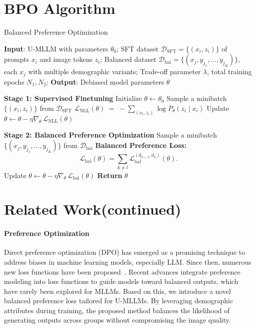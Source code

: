 \section{BPO Algorithm}
\begin{algorithm}[ht]
\caption{Balanced Preference Optimization}
\label{alg:balanced_finetuning}
\textbf{Input}: U-MLLM with parameters $\theta_0$; SFT dataset $\mathcal{D}_{\text{SFT}} = \{(x_i, z_i)\}$ of prompts $x_i$ and image tokens $z_i$; Balanced dataset $\mathcal{D}_{\text{bal}} = \{(x_j, y_{j_1}, \ldots, y_{j_K})\}$, each $x_j$ with multiple demographic variants; Trade-off parameter $\lambda$, total training epochs $N_1, N_2$;
\textbf{Output}: Debiased model parameters $\theta$

\begin{algorithmic}[1]
\STATE \textbf{Stage 1: Supervised Finetuning}
\STATE \quad Initialize $\theta \leftarrow \theta_0$
    \STATE Sample a minibatch $\{(x_i, z_i)\}$ from $\mathcal{D}_{\text{SFT}}$
    \STATE $\mathcal{L}_{\mathrm{NLL}}(\theta)\;=\; -\sum_{(x_i,z_i)}\log P_\theta(z_i \mid x_i)$
    \STATE Update $\theta \leftarrow \theta - \eta \nabla_{\theta}\,\mathcal{L}_{\mathrm{NLL}}(\theta)$
\ENDFOR

\STATE \textbf{Stage 2: Balanced Preference Optimization}
    \STATE Sample a minibatch $\{(x_j, y_{j_1},\ldots,y_{j_K})\}$ from $\mathcal{D}_{\text{bal}}$
    \STATE \textbf{Balanced Preference Loss:} 
    \[
       \mathcal{L}_{\mathrm{bal}}(\theta)
       =
       \sum_{k\neq l}
        \mathcal{L}_{\mathrm{bal}}^{(d_{k-1},d_k)}(\theta).
    \]
    \STATE Update $\theta \leftarrow \theta - \eta \nabla_{\theta}\,\mathcal{L}_{\mathrm{bal}}(\theta)$
\ENDFOR
\STATE \textbf{Return} $\theta$
\end{algorithmic}
\end{algorithm}
\newpage
\section{Related Work(continued)}
\label{sec:related_work_continue}
\paragraph{Preference Optimization}  
Direct preference optimization (DPO) \cite{rafailov2024direct} has emerged as a promising technique to address biases in machine learning models, especially LLM. Since then, numerous new loss functions have been proposed~\cite{meng2024simposimplepreferenceoptimization, park2024disentanglinglengthqualitydirect, hong2024orpomonolithicpreferenceoptimization, ethayarajh2024ktomodelalignmentprospect, azar2023generaltheoreticalparadigmunderstand}.
Recent advances \cite{amini2024direct} integrate preference modeling into loss functions to guide models toward balanced outputs, which have rarely been explored for MLLMs.
Based on this, we introduce a novel balanced preference loss tailored for U-MLLMs.
By leveraging demographic attributes during training, the proposed method balances the likelihood of generating outputs across groups without compromising the image quality.


